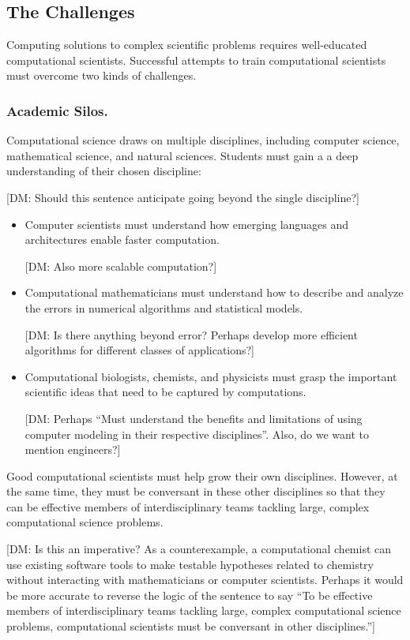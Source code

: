 \documentclass[11pt]{NSFamsart}
\begin{document}
\subsection*{The Challenges}
Computing solutions to complex scientific problems requires well-educated computational scientists.  Successful attempts to train computational scientists must overcome two kinds of challenges.

\subsubsection*{Academic Silos.} Computational science draws on multiple disciplines, including computer science, mathematical science, and natural sciences.  Students must gain a a deep understanding of their chosen discipline:

{\color{green}[DM: Should this sentence anticipate going beyond the single discipline?]}

\begin{itemize}
\item Computer scientists must understand how emerging languages and architectures enable faster computation.  

{\color{green}[DM: Also more scalable computation?]}

\item Computational mathematicians must understand how to describe and analyze the errors in numerical algorithms and statistical models.

{\color{green}[DM: Is there anything beyond error? Perhaps develop more efficient algorithms for different classes of applications?]}

\item Computational biologists, chemists, and physicists must grasp the important scientific ideas that need to be captured by computations.  

{\color{green}[DM: Perhaps ``Must understand the benefits and limitations of using computer modeling in their respective disciplines''. Also, do we want to mention engineers?]}

\end{itemize}
Good computational scientists must help grow their own disciplines.  However, at the same time, they must be conversant in these other disciplines so that they can be effective members of  interdisciplinary teams tackling large, complex computational science problems.

{\color{green}[DM: Is this an imperative? As a counterexample, a computational chemist can use existing software tools to make testable hypotheses related to chemistry without interacting with mathematicians or computer scientists. Perhaps it would be more accurate to reverse the logic of the sentence to say ``To be effective members of interdisciplinary teams tackling large, complex computational science problems, computational scientists must be conversant in other disciplines.'']}
\end{document}
